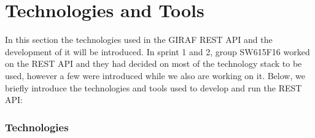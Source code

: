 \section{Technologies and Tools}\label{sec:techstack}
In this section the technologies used in the GIRAF REST API and the development of it will be introduced.
In sprint 1 and 2, group SW615F16 worked on the REST API and they had decided on most of the technology stack to be used, however a few were introduced while we also are working on it.
Below, we briefly introduce the technologies and tools used to develop and run the REST API:
\subsubsection{Technologies}
